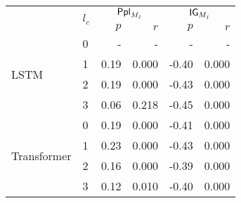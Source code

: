 \begin{tabular}{llrrrr}
\toprule
    & \multirow{2}{*}{$l_c$} & \multicolumn{2}{c}{$\mathsf{Ppl}_{M_j}$} & \multicolumn{2}{c}{$\mathsf{IG}_{M_j}$} \\
                              &       &         $p$ &            $r$ &           $p$ &          $r$ \\
\midrule
\multirow{4}{*}{LSTM}         & 0 &            - &              - &             - &             - \\
                              & 1 &         0.19 &          0.000 &         -0.40 &         0.000 \\
                              & 2 &         0.19 &          0.000 &         -0.43 &         0.000 \\
                              & 3 &         0.06 &          0.218 &         -0.45 &         0.000 \\
\midrule
\multirow{4}{*}{Transformer}  & 0 &         0.19 &          0.000 &         -0.41 &         0.000 \\
                              & 1 &         0.23 &          0.000 &         -0.43 &         0.000 \\
                              & 2 &         0.16 &          0.000 &         -0.39 &         0.000 \\
                              & 3 &         0.12 &          0.010 &         -0.40 &         0.000 \\
\bottomrule
\end{tabular}

